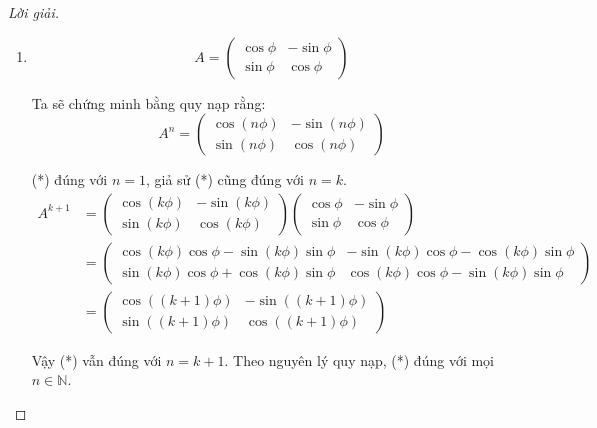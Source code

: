\documentclass[class=linearalgebra,crop=false]{standalone}
\begin{document}
\begin{proof}[Lời giải]
    \begin{enumerate}
        \item 
            \[
                A = \begin{pmatrix}
                    \cos\phi & -\sin\phi \\
                    \sin\phi & \cos\phi
                \end{pmatrix}
            \]
            \par Ta sẽ chứng minh bằng quy nạp rằng:
            \[
                A^{n} =
                \begin{pmatrix}
                    \cos(n\phi) & -\sin(n\phi) \\
                    \sin(n\phi) & \cos(n\phi)
                \end{pmatrix}
                \tag{*}
            \]
            \par (*) đúng với $n = 1$, giả sử (*) cũng đúng với $n = k$.
            \begin{align*}
                A^{k+1} & =
                \begin{pmatrix}
                    \cos(k\phi) & -\sin(k\phi) \\
                    \sin(k\phi) & \cos(k\phi)
                \end{pmatrix}
                \begin{pmatrix}
                    \cos\phi & -\sin\phi \\
                    \sin\phi & \cos\phi
                \end{pmatrix} \\
                        & =
                \begin{pmatrix}
                    \cos(k\phi)\cos\phi - \sin(k\phi)\sin\phi & -\sin(k\phi)\cos\phi - \cos(k\phi)\sin\phi \\
                    \sin(k\phi)\cos\phi + \cos(k\phi)\sin\phi & \cos(k\phi)\cos\phi - \sin(k\phi)\sin\phi
                \end{pmatrix} \\
                        & = 
                \begin{pmatrix}
                    \cos((k+1)\phi) & -\sin((k+1)\phi) \\
                    \sin((k+1)\phi) & \cos((k+1)\phi)
                \end{pmatrix}
            \end{align*}
            \par Vậy (*) vẫn đúng với $n = k+1$. Theo nguyên lý quy nạp, (*) đúng với mọi $n\in\mathbb{N}$.

\end{enumerate}
\end{proof}
\end{document}
